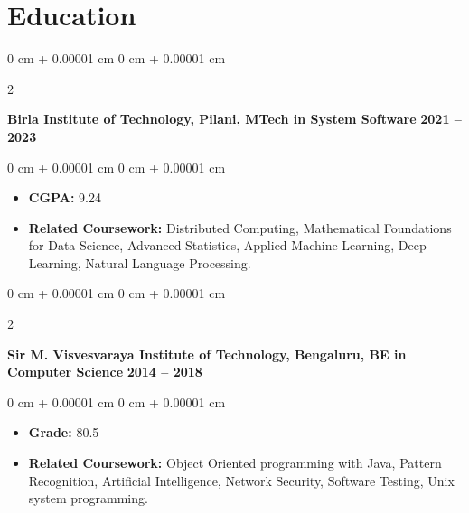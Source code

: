 \documentclass[10pt, letterpaper]{article}
\newenvironment{highlights}{
    \begin{itemize}[
        topsep=0.10 cm,
        parsep=0.10 cm,
        partopsep=0pt,
        itemsep=0pt,
        leftmargin=0 cm + 10pt
    ]
}{
    \end{itemize}
} %
\newenvironment{onecolentry}{
    \begin{adjustwidth}{
        0 cm + 0.00001 cm
    }{
        0 cm + 0.00001 cm
    }
}{
    \end{adjustwidth}
} %
\newenvironment{twocolentry}[2][]{
    \onecolentry
    \def\secondColumn{#2}
    \setcolumnwidth{\fill, 4.5 cm}
    \begin{paracol}{2}
}{
    \switchcolumn \raggedleft \secondColumn
    \end{paracol}
    \endonecolentry
} %
\begin{document}
    \section{Education}        
        \begin{twocolentry}{
            \textbf{2021 – 2023}
        }
            \textbf{{\color{MidnightBlue}Birla Institute of Technology, Pilani}, MTech in System Software}\end{twocolentry}

        \vspace{0.10 cm}
        \begin{onecolentry}
            \begin{highlights}
                \item \textbf{CGPA:} 9.24
                \item \textbf{Related Coursework:} Distributed Computing, Mathematical Foundations for Data Science, Advanced Statistics, Applied Machine Learning, Deep Learning, Natural Language Processing.
            \end{highlights}
        \end{onecolentry}

        \vspace{0.50 cm}

        \begin{twocolentry}{
            \textbf{2014 – 2018}
        }
            \textbf{{\color{MidnightBlue}Sir M. Visvesvaraya Institute of Technology, Bengaluru}, BE in Computer Science}\end{twocolentry}

        \vspace{0.10 cm}
        \begin{onecolentry}
            \begin{highlights}
                \item \textbf{Grade:} 80.5%
                \item \textbf{Related Coursework:} Object Oriented programming with Java, Pattern Recognition, Artificial Intelligence, Network Security, Software Testing, Unix system programming.  
            \end{highlights}
        \end{onecolentry}
\end{document}
